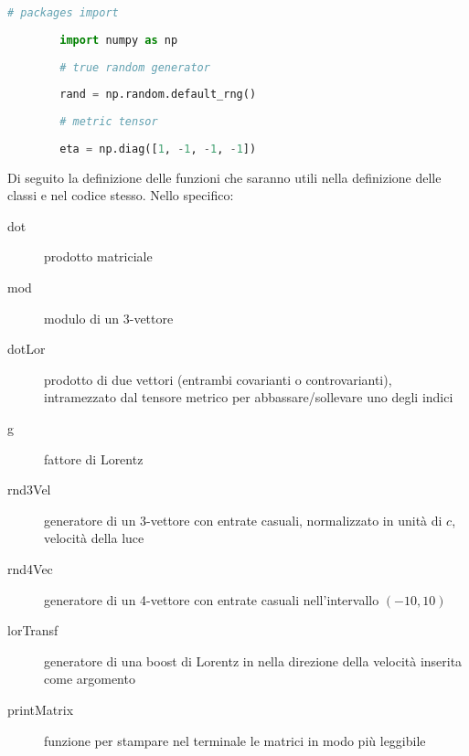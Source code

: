 \documentclass[12pt,notitlepage]{report}
\begin{document}
\begin{lstlisting}[language=Python]
		# packages import
		
		import numpy as np
		
		# true random generator
		
		rand = np.random.default_rng()
		
		# metric tensor
		
		eta = np.diag([1, -1, -1, -1])
\end{lstlisting}

Di seguito la definizione delle funzioni che saranno utili nella definizione delle classi e nel codice stesso. Nello specifico:

\begin{description}
	\item[dot] prodotto matriciale
	
	\item[mod] modulo di un 3-vettore
	
	\item[dotLor] prodotto di due vettori (entrambi covarianti o controvarianti), intramezzato dal tensore metrico per abbassare/sollevare uno degli indici
	
	\item[g] fattore di Lorentz
	
	\item[rnd3Vel] generatore di un 3-vettore con entrate casuali, normalizzato in unità di $c$, velocità della luce
	
	\item[rnd4Vec] generatore di un 4-vettore con entrate casuali nell'intervallo $(-10,10)$
	
	\item[lorTransf] generatore di una boost di Lorentz in nella direzione della velocità inserita come argomento
	
	\item[printMatrix] funzione per stampare nel terminale le matrici in modo più leggibile
\end{description}
\end{document}

